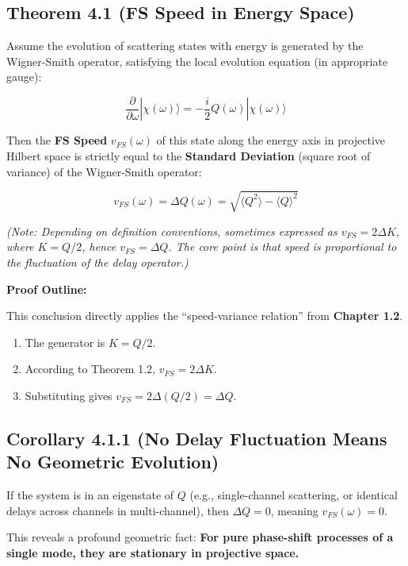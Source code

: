 \subsection{Theorem 4.1 (FS Speed in Energy Space)}

Assume the evolution of scattering states with energy is generated by the Wigner-Smith operator, satisfying the local evolution equation (in appropriate gauge):

$$\frac{\partial}{\partial \omega} |\chi(\omega)\rangle = -\frac{i}{2} Q(\omega) |\chi(\omega)\rangle$$

Then the \textbf{FS Speed} $v_{FS}(\omega)$ of this state along the energy axis in projective Hilbert space is strictly equal to the \textbf{Standard Deviation} (square root of variance) of the Wigner-Smith operator:

$$v_{FS}(\omega) = \Delta Q(\omega) = \sqrt{\langle Q^2 \rangle - \langle Q \rangle^2}$$

\textit{(Note: Depending on definition conventions, sometimes expressed as $v_{FS} = 2\Delta K$, where $K=Q/2$, hence $v_{FS}=\Delta Q$. The core point is that speed is proportional to the fluctuation of the delay operator.)}

\textbf{Proof Outline:}

This conclusion directly applies the ``speed-variance relation'' from \textbf{Chapter 1.2}.

\begin{enumerate}
\item The generator is $K = Q/2$.

\item According to Theorem 1.2, $v_{FS} = 2\Delta K$.

\item Substituting gives $v_{FS} = 2\Delta(Q/2) = \Delta Q$.
\end{enumerate}

\subsection{Corollary 4.1.1 (No Delay Fluctuation Means No Geometric Evolution)}

If the system is in an eigenstate of $Q$ (e.g., single-channel scattering, or identical delays across channels in multi-channel), then $\Delta Q = 0$, meaning $v_{FS}(\omega) = 0$.

This reveals a profound geometric fact: \textbf{For pure phase-shift processes of a single mode, they are stationary in projective space.}

